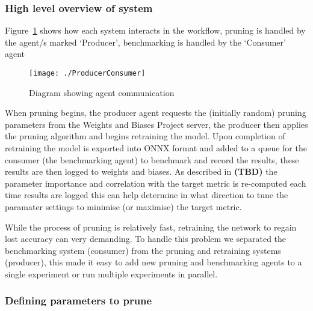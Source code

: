 \documentclass[../Dissertation.tex]{subfiles}
\begin{document}
\newpage
\subsubsection{High level overview of system}

Figure~\ref{fig:agentCommunication} shows how each system interacts in the workflow, pruning is handled by the agent/s marked `Producer', benchmarking is handled by the `Consumer' agent

\begin{figure}[H]
    \centering
    \texttt{[image: ./ProducerConsumer]}
    \caption{Diagram showing agent communication}
    \label{fig:agentCommunication}
\end{figure}

When pruning begins, the producer agent requests the (initially random) pruning parameters from the Weights and Biases Project server, the producer then applies the pruning algorithm and begins retraining the model. Upon completion of retraining the model is exported into ONNX format and added to a queue for the consumer (the benchmarking agent) to benchmark and record the results, these results are then logged to weights and biases.
As described in \textbf{(TBD)} the parameter importance and correlation with the target metric is re-computed each time results are logged this can help determine in what direction to tune the paramater settings to minimise (or maximise) the target metric.

While the process of pruning is relatively fast, retraining the network to regain lost accuracy can very demanding. To handle this problem we separated the benchmarking system (consumer) from the pruning and retraining systems (producer), this made it easy to add new pruning and benchmarking agents to a single experiment or run multiple experiments in parallel.

\subsubsection{Defining parameters to prune}
\end{document}
